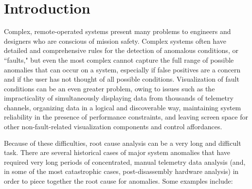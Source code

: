 \chapter{Introduction}

Complex, remote-operated systems present many problems to engineers and designers who are conscious of mission safety. Complex systems often have detailed and comprehensive rules for the detection of anomalous conditions, or ``faults," but even the most complex cannot capture the full range of possible anomalies that can occur on a system, especially if false positives are a concern and if the user has not thought of all possible conditions. Visualization of fault conditions can be an even greater problem, owing to issues such as the impracticality of simultaneously displaying data from thousands of telemetry channels, organizing data in a logical and discoverable way, maintaining system reliability in the presence of performance constraints, and leaving screen space for other non-fault-related visualization components and control affordances.

Because of these difficulties, root cause analysis can be a very long and difficult task. There are several historical cases of major system anomalies that have required very long periods of concentrated, manual telemetry data analysis (and, in some of the most catastrophic cases, post-disassembly hardware analysis) in order to piece together the root cause for anomalies. Some examples include:

